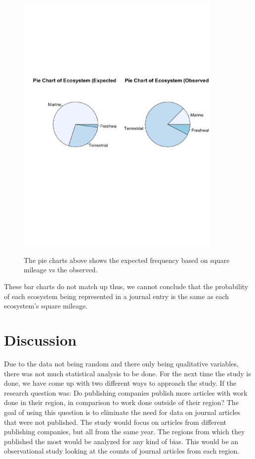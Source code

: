 \documentclass[12pt, letterpaper]{article}
\begin{document}
\begin{figure}[h]
\begin{center}
	\includegraphics[width=10cm]{pie-eco-2.pdf}
	\label{fig: Expected Frequency based on Square Mileage vs Observed Frequency}
	\caption{The pie charts above shows the expected frequency based on square mileage vs the observed.}
\end{center}
\end{figure}

These bar charts do not match up thus, we cannot conclude that the probability of each ecosystem being represented in a journal entry is the same as each ecosystem's square mileage.

\pagebreak

\section{Discussion}
Due to the data not being random and there only being qualitative variables, there was not much statistical analysis to be done. For the next time the study is done, we have come up with two different ways to approach the study. If the research question was: Do publishing companies publish more articles with work done in their region, in comparison to work done outside of their region? The goal of using this question is to eliminate the need for data on journal articles that were not published. The study would focus on articles from different publishing companies, but all from the same year. The regions from which they published the most would be analyzed for any kind of bias. This would be an observational study looking at the counts of journal articles from each region. 
\end{document}
